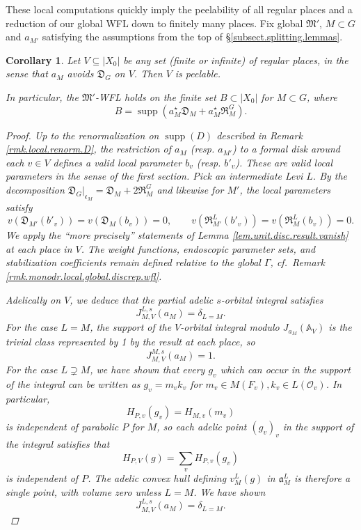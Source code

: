 \documentclass[openany]{amsbook}
\newtheorem{corollary}[theorem]{Corollary}
\theoremstyle{definition}
\theoremstyle{remark}
\numberwithin{equation}{section}
\renewcommand{\O}{\mathcal{O}}
\newcommand{\A}{\mathbb{A}}
\renewcommand{\-}{\operatorname{-}}
\renewcommand{\a}{\mathfrak{a}}
\newcommand{\on}[1]{\operatorname{#1}}
\renewcommand{\A}{\mathbb{A}}
\newcommand{\fc}{\mathfrak{c}}
\newcommand{\fD}{\mathfrak{D}}
\newcommand{\fR}{\mathfrak{R}}
\newcommand{\fM}{\mathfrak{M}}
\begin{document}
These local computations quickly imply the peelability of all regular places and a reduction of our global WFL down to finitely many places. Fix global $\fM'$, $M \subset G$ and $a_{M'}$ satisfying the assumptions from the top of \S \ref{subsect.splitting.lemmas}. 

\begin{corollary}\label{cor.reg.v.peelable}
    Let $V \subseteq |X_0|$ be any set (finite or infinite) of regular places, in the sense that $a_M$ avoids $\fD_G$ on $V$. Then $V$ is peelable.

    In particular, the $\fM'$-WFL holds on the finite set $B \subset |X_0|$ for $M \subset G$, where
    $$
        B = \on{supp}(a_M^\star \fD_M + a_M^\star\fR_M^G).
    $$
    \begin{proof}
        Up to the renormalization on $\on{supp}(D)$ described in Remark \ref{rmk.local.renorm.D}, the restriction of $a_{M}$ (resp. $a_{M'}$) to a formal disk around each $v \in V$ defines a valid local parameter $b_v$ (resp. $b'_v$). These are valid local parameters in the sense of the first section. Pick an intermediate Levi $L$. By the decomposition $\fD_G|_{\fc_M} = \fD_M + 2 \fR_M^G$ and likewise for $M'$, the local parameters satisfy
        $$
            v(\fD_{M'}(b'_v)) = v(\fD_M(b_v)) = 0, \qquad v(\fR_{M'}^L(b'_v)) = v(\fR_M^L(b_v)) = 0.
        $$
        We apply the ``more precisely'' statements of Lemma \ref{lem.unit.disc.result.vanish} at each place in $V$. The weight functions, endoscopic parameter sets, and stabilization coefficients remain defined relative to the global $\Gamma$, cf.\ Remark \ref{rmk.monodr.local.global.discrep.wfl}. 
        
        Adelically on $V$, we deduce that the partial \emph{adelic} $s$-orbital integral satisfies
        $$
            J^{L, s}_{M,V}(a_M) = \delta_{L = M}.
        $$
        For the case $L = M$, the support of the $V$-orbital integral modulo $J_{a_M}(\A_V)$ is the trivial class represented by 1 by the result at each place, so 
        $$
            J^{M, s}_{M,V}(a_M) = 1.
        $$
        For the case $L \supsetneq M$, we have shown that every $g_v$ which can occur in the support of the integral can be written as $g_v = m_v k_v$ for $m_v \in M(F_v), k_v \in L(\O_v)$. In particular,
        $$
            H_{P,v}(g_v) = H_{M,v}(m_v)
        $$
        is independent of parabolic $P$ for $M$, so each adelic point $(g_v)_v$ in the support of the integral satisfies that
        $$
            H_{P,V}(g) = \sum_v H_{P,v}(g_v)
        $$
        is independent of $P$. The adelic convex hull defining $v_M^L(g)$ in $\a_M^L$ is therefore a single point, with volume zero unless $L = M$. We have shown
        $$
            J^{L, s}_{M,V}(a_M) = \delta_{L = M}.
        $$
        

\end{proof}
\end{corollary}
\end{document}
